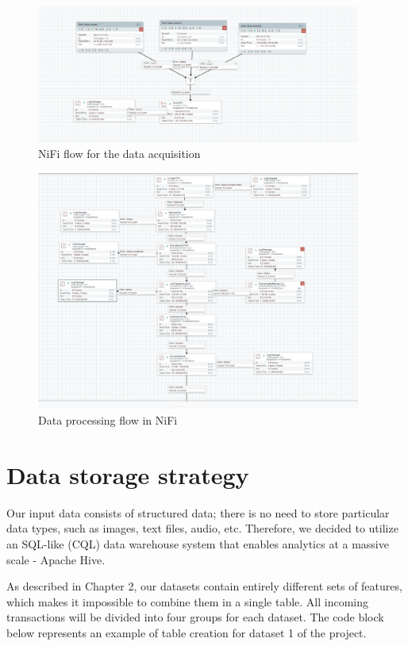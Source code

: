 \documentclass[12pt,a4paper, hidelinks]{article}
\begin{document}
\begin{figure}[h!]
    \centering
    \includegraphics[width=0.95\textwidth]{images/m3-nifi-main-view.png}
    \caption{NiFi flow for the data acquisition}
    \label{fig:nifi1}
\end{figure}
\begin{figure}[h!]
    \centering
    \includegraphics[width=0.95\textwidth]{images/m3-nifi-processor.png}
    \caption{Data processing flow in NiFi}
    \label{fig:nifi2}
\end{figure}
\section{Data storage strategy}

Our input data consists of structured data; there is no need to store particular data types, such as images, text files, audio, etc. Therefore, we decided to utilize an SQL-like (CQL) data warehouse system that enables analytics at a massive scale - Apache Hive.

As described in Chapter 2, our datasets contain entirely different sets of features, which makes it impossible to combine them in a single table. All incoming transactions will be divided into four groups for each dataset. The code block below represents an example of table creation for dataset 1 of the project.
\end{document}
